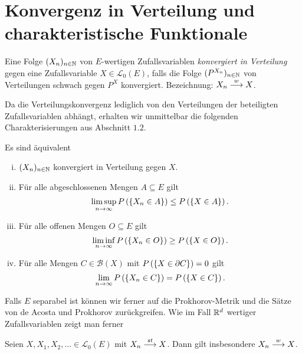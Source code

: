 \section{Konvergenz in Verteilung und charakteristische Funktionale}

\begin{mydef}
    Eine Folge $(X_n)_{n \in \mathbb{N}}$ von $E$-wertigen Zufallsvariablen \textit{konvergiert in Verteilung} gegen eine Zufallsvariable $X \in \mathcal{L}_0(E)$,
    falls die Folge $(P^{X_n})_{n \in \mathbb{N}}$ von Verteilungen schwach gegen $P^X$ konvergiert. 
    \newline 
    Bezeichnung: $X_n \overset{w}{\longrightarrow} X$. 
\end{mydef}

Da die Verteilungskonvergenz lediglich von den Verteilungen der beteiligten Zufallsvariablen abhängt, erhalten wir unmittelbar die folgenden Charakterisierungen aus Abschnitt $1.2$.
\begin{proposition}
    Es sind äquivalent
    \begin{enumerate}[(i)]
        \item $(X_n)_{n \in \mathbb{N}}$ konvergiert in Verteilung gegen $X$. 
        \item Für alle abgeschlossenen Mengen $A \subseteq E$ gilt 
        $$
            \limsup_{n \to \infty}P\left(\left\{ X_n \in A \right\}\right) \leq P\left(\left\{ X \in A \right\}\right).
        $$
        \item Für alle offenen Mengen $O \subseteq E$ gilt
        $$
            \liminf_{n \to \infty}P\left(\left\{ X_n \in O \right\}\right) \geq P\left(\left\{ X \in O \right\}\right).
        $$
        \item Für alle Mengen $C \in \mathcal{B}(X)$ mit $P\left(\left\{ X \in \partial C \right\}\right) = 0$ gilt 
        $$
            \lim_{n \to \infty}P\left(\left\{ X_n \in C \right\}\right) = P\left(\left\{ X \in C \right\}\right). 
        $$
    \end{enumerate}
\end{proposition}

Falls $E$ separabel ist können wir ferner auf die Prokhorov-Metrik und die Sätze von de Acosta und Prokhorov zurückgreifen. Wie im Fall $\mathbb{R}^d$ wertiger Zufallsvariablen zeigt man ferner 
\begin{proposition}
    Seien $X,X_1,X_2,... \in \mathcal{L}_0(E)$ mit $X_n \overset{st}{\longrightarrow} X$. Dann gilt insbesondere $X_n \overset{w}{\longrightarrow} X$. 
\end{proposition}\ 
\newline




